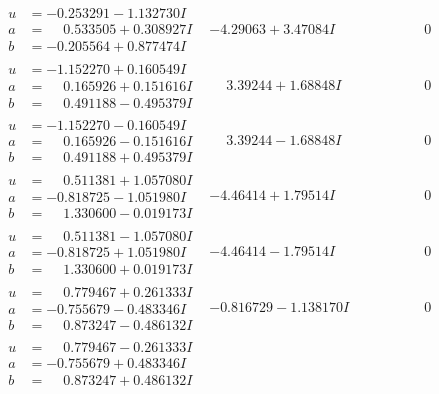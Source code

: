 \documentclass[1p]{elsarticle_modified}
\theoremstyle{definition}
\begin{document}
$$\begin{array}{c|c|c}
\begin{aligned}
u &= -0.253291 - 1.132730 I \\
a &= \phantom{-}0.533505 + 0.308927 I \\
b &= -0.205564 + 0.877474 I\end{aligned}
 & -4.29063 + 3.47084 I & \phantom{-0.000000 } 0 \\ \hline\begin{aligned}
u &= -1.152270 + 0.160549 I \\
a &= \phantom{-}0.165926 + 0.151616 I \\
b &= \phantom{-}0.491188 - 0.495379 I\end{aligned}
 & \phantom{-}3.39244 + 1.68848 I & \phantom{-0.000000 } 0 \\ \hline\begin{aligned}
u &= -1.152270 - 0.160549 I \\
a &= \phantom{-}0.165926 - 0.151616 I \\
b &= \phantom{-}0.491188 + 0.495379 I\end{aligned}
 & \phantom{-}3.39244 - 1.68848 I & \phantom{-0.000000 } 0 \\ \hline\begin{aligned}
u &= \phantom{-}0.511381 + 1.057080 I \\
a &= -0.818725 - 1.051980 I \\
b &= \phantom{-}1.330600 - 0.019173 I\end{aligned}
 & -4.46414 + 1.79514 I & \phantom{-0.000000 } 0 \\ \hline\begin{aligned}
u &= \phantom{-}0.511381 - 1.057080 I \\
a &= -0.818725 + 1.051980 I \\
b &= \phantom{-}1.330600 + 0.019173 I\end{aligned}
 & -4.46414 - 1.79514 I & \phantom{-0.000000 } 0 \\ \hline\begin{aligned}
u &= \phantom{-}0.779467 + 0.261333 I \\
a &= -0.755679 - 0.483346 I \\
b &= \phantom{-}0.873247 - 0.486132 I\end{aligned}
 & -0.816729 - 1.138170 I & \phantom{-0.000000 } 0 \\ \hline\begin{aligned}
u &= \phantom{-}0.779467 - 0.261333 I \\
a &= -0.755679 + 0.483346 I \\
b &= \phantom{-}0.873247 + 0.486132 I\end{aligned}

\end{array}$$
\end{document}
